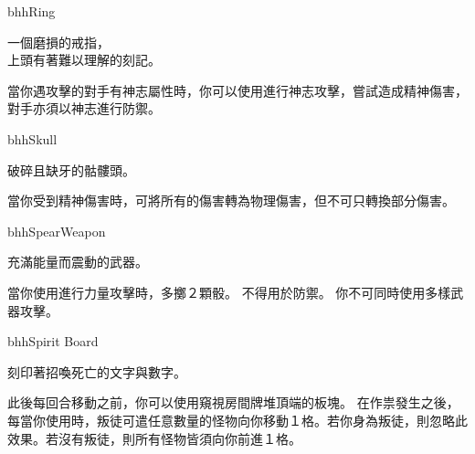 \linebreak[0]%
\begin{OmenCard}{bhh}{Ring}{}
  \begin{CardStory}
    一個磨損的戒指，\\
    上頭有著難以理解的刻記。
  \end{CardStory}
  當你遇攻擊的對手有神志屬性時，你可以使用\ThisName{}進行神志攻擊，嘗試造成精神傷害，對手亦須以神志進行防禦。\smallbreak
\end{OmenCard}%
\linebreak[0]%
\begin{OmenCard}{bhh}{Skull}{}
  \begin{CardStory}
    破碎且缺牙的骷髏頭。
  \end{CardStory}
  當你受到精神傷害時，可將所有的傷害轉為物理傷害，但不可只轉換部分傷害。\smallbreak
\end{OmenCard}%
\linebreak[0]%
\begin{OmenCard}{bhh}{Spear}{Weapon}
  \begin{CardStory}
    充滿能量而震動的武器。
  \end{CardStory}
  當你使用\ThisName{}進行力量攻擊時，多擲２顆骰。\smallbreak
  \ThisName{}不得用於防禦。\smallbreak
  你不可同時使用多樣武器攻擊。\smallbreak
\end{OmenCard}%
\linebreak[0]%
\begin{OmenCard}{bhh}{Spirit Board}{}
  \begin{CardStory}
    刻印著招喚死亡的文字與數字。
  \end{CardStory}
  此後每回合移動之前，你可以使用\ThisName{}窺視房間牌堆頂端的板塊。\smallbreak
  在作祟發生之後，每當你使用\ThisName{}時，叛徒可遣任意數量的怪物向你移動１格。若你身為叛徒，則忽略此效果。若沒有叛徒，則所有怪物皆須向你前進１格。\smallbreak
\end{OmenCard}%
\linebreak[0]%
